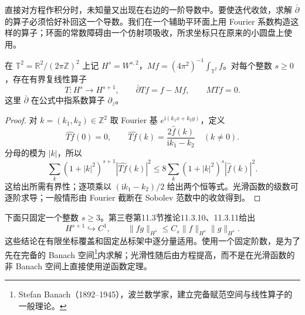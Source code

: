 直接对方程作积分时，未知量又出现在右边的一阶导数中。要使迭代收敛，求解 \(\bar\partial\) 的算子必须恰好补回这一个导数。我们在一个辅助平环面上用 Fourier 系数构造这样的算子；环面的常数障碍由一个仿射项吸收，所求坐标只在原来的小圆盘上使用。

\begin{lemma}\label{g4:lem:0602:periodic-right-inverse}
	在 \(\mathbb T^2=\mathbb R^2/(2\pi\mathbb Z)^2\) 上记 \(H^s=W^{s,2}\)，\(M f=(4\pi^2)^{-1}\int_{\mathbb T^2}f\)。对每个整数 \(s\ge0\)，存在有界复线性算子
	\[
		T:H^s\longrightarrow H^{s+1},\qquad
		\bar\partial T f=f-Mf,\qquad MTf=0.
	\]
	这里 \(\bar\partial\) 在公式中指系数算子 \(\partial_{\overline z}\)。
\end{lemma}
\begin{proof}
	对 \(k=(k_1,k_2)\in\mathbb Z^2\) 取 Fourier 基 \(e^{\mathrm{i}(k_1x+k_2y)}\)，定义
	\[
		\widehat{Tf}(0)=0,\qquad
		\widehat{Tf}(k)=\frac{2\widehat f(k)}{\mathrm{i}k_1-k_2}
		\quad(k\ne0).
	\]
	分母的模为 \(|k|\)，所以
	\[
		\sum_k(1+|k|^2)^{s+1}|\widehat{Tf}(k)|^2
		\le8\sum_k(1+|k|^2)^s|\widehat f(k)|^2.
	\]
	这给出所需有界性；逐项乘以 \((\mathrm{i}k_1-k_2)/2\) 给出两个恒等式。光滑函数的级数可逐阶求导；一般情形由 Fourier 截断在 Sobolev 范数中的收敛得到。
\end{proof}

下面只固定一个整数 \(s\ge3\)。第三卷第11.3节推论11.3.10、11.3.11给出
\begin{equation}\label{g4:eq:0602:sobolev-tools}
	H^{s+1}\hookrightarrow C^1,
	\qquad \|fg\|_{H^s}\le C_s\|f\|_{H^s}\|g\|_{H^s}.
\end{equation}
这些结论在有限坐标覆盖和固定丛标架中逐分量适用。使用一个固定阶数，是为了先在完备的 Banach 空间\footnote{Stefan Banach（1892--1945），波兰数学家，建立完备赋范空间与线性算子的一般理论。}内求解；光滑性随后由方程提高，而不是在光滑函数的非 Banach 空间上直接使用逆函数定理。

